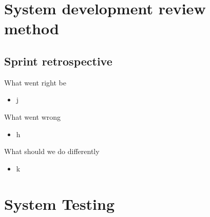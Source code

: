 \documentclass[11 pt]{article}
\begin{document}
\newpage
\section{System development review method} 
\subsection{Sprint retrospective}
What went right  be
\begin{itemize}
\item j

\end{itemize}
What went wrong
\begin{itemize}
\item h

\end{itemize}
What should we do differently
\begin{itemize}
\item k
\end{itemize}
\section{System Testing}
\end{document}
